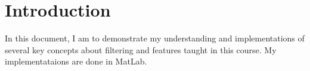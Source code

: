 \documentclass[dissertation.tex]{subfiles}
\begin{document}
\chapter{Introduction}
In this document, I am to demonstrate my understanding and implementations of several key concepts about filtering and features taught in this course. My implementataions are done in MatLab.
\end{document}
